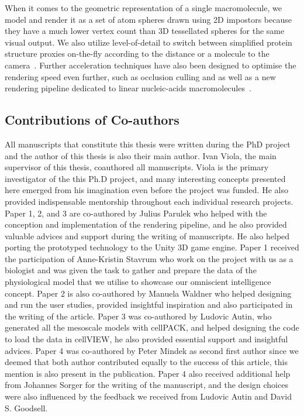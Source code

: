When it comes to the geometric representation of a single macromolecule, we model and render it as a set of atom spheres drawn using 2D impostors because they have a much lower vertex count than 3D tessellated spheres for the same visual output.
We also utilize level-of-detail to switch between simplified protein structure proxies on-the-fly according to the distance or a molecule to the camera~\cite{le2014illustrative}.
Further acceleration techniques have also been designed to optimise the rendering speed even further, such as occlusion culling and as well as a new rendering pipeline dedicated to linear nucleic-acids macromolecules~\cite{le2015cellview}. 

\subsection{Contributions of Co-authors}

All manuscripts that constitute this thesis were written during the PhD project and the author of this thesis is also their main author. 
Ivan Viola, the main supervisor of this thesis, coauthored all manuscripts. 
Viola is the primary investigator of the this Ph.D project, and many interesting concepts presented here emerged from his imagination even before the project was funded. 
He also provided indispensable mentorship throughout each individual research projects.
Paper 1, 2, and 3 are co-authored by Julius Parulek who helped with the conception and implementation of the rendering pipeline, and he also provided valuable advices and support during the writing of manuscripts.
He also helped porting the prototyped technology to the Unity 3D game engine. 
Paper 1 received the participation of Anne-Kristin Stavrum who work on the project with us as a biologist and was given the task to gather and prepare the data of the physiological model that we utilise to showcase our omniscient intelligence concept. 
Paper 2 is also co-authored by Manuela Waldner who helped designing and run the user studies, provided insightful inspiration and also participated in the writing of the article. 
Paper 3 was co-authored by Ludovic Autin, who generated all the mesoscale models with cellPACK, and helped designing the code to load the data in cellVIEW, he also provided essential support and insightful advices.
Paper 4 was co-authored by Peter Mindek as second first author since we deemed that both author contributed equally to the success of this article, this mention is also present in the publication.
Paper 4 also received additional help from Johannes Sorger for the writing of the manuscript, and the design choices were also influenced by the feedback we received from Ludovic Autin and David S. Goodsell.

